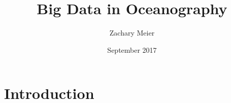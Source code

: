 \documentclass{article}
\title{Big Data in Oceanography}
\author{Zachary Meier }
\date{September 2017}
\begin{document}
\maketitle

\section{Introduction}
\end{document}
